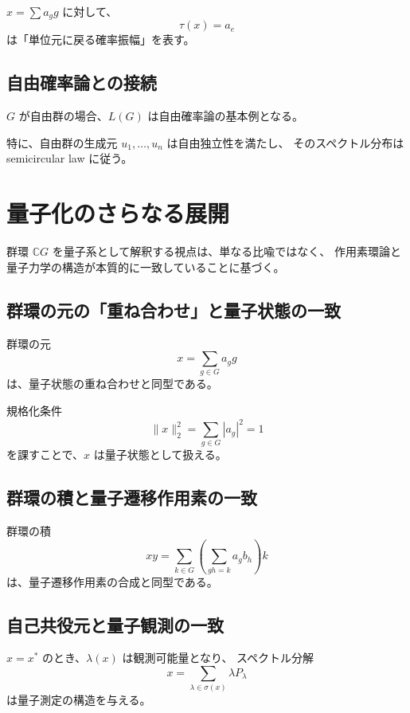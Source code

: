 \documentclass[12pt,a4paper]{ltjarticle}
\theoremstyle{definition}
\begin{document}
$x = \sum a_g g$ に対して、
\[
\tau(x) = a_e
\]
は「単位元に戻る確率振幅」を表す。

\subsection{自由確率論との接続}

$G$ が自由群の場合、$L(G)$ は自由確率論の基本例となる。

特に、自由群の生成元 $u_1, \dots, u_n$ は自由独立性を満たし、
そのスペクトル分布は semicircular law に従う。

\section{量子化のさらなる展開}

群環 $\mathbb{C}G$ を量子系として解釈する視点は、単なる比喩ではなく、
作用素環論と量子力学の構造が本質的に一致していることに基づく。

\subsection{群環の元の「重ね合わせ」と量子状態の一致}

群環の元
\[
x = \sum_{g \in G} a_g g
\]
は、量子状態の重ね合わせと同型である。

規格化条件
\[
\|x\|_2^2 = \sum_{g \in G} |a_g|^2 = 1
\]
を課すことで、$x$ は量子状態として扱える。

\subsection{群環の積と量子遷移作用素の一致}

群環の積
\[
xy = \sum_{k \in G} \left( \sum_{gh=k} a_g b_h \right) k
\]
は、量子遷移作用素の合成と同型である。

\subsection{自己共役元と量子観測の一致}

$x = x^*$ のとき、$\lambda(x)$ は観測可能量となり、
スペクトル分解
\[
x = \sum_{\lambda \in \sigma(x)} \lambda P_\lambda
\]
は量子測定の構造を与える。
\end{document}
